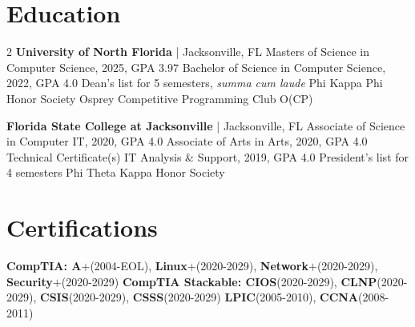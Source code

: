 \documentclass[10pt]{report}
\begin{document}
\section*{Education}
\vspace{-1.25em}
\setlength{\columnsep}{-2em}
\begin{multicols}{2}
\textbf{University of North Florida} | Jacksonville, FL \newline
Masters of Science in Computer Science, 2025, GPA 3.97 \newline
Bachelor of Science in Computer Science, 2022, GPA 4.0 \newline
Dean's list for 5 semesters, \textit{summa cum laude} \newline
Phi Kappa Phi Honor Society \newline
Osprey Competitive Programming Club O(CP)
\columnbreak

\textbf{Florida State College at Jacksonville} | Jacksonville, FL \newline
Associate of Science in Computer IT, 2020, GPA 4.0 \newline
Associate of Arts in Arts, 2020, GPA 4.0 \newline
Technical Certificate(s) IT Analysis \& Support, 2019, GPA 4.0 \newline
President's list for 4 semesters \newline
Phi Theta Kappa Honor Society
\end{multicols}
\vspace{-1em}

\section*{Certifications}
\textbf{CompTIA: A$\bm{+}$}(2004-EOL), \textbf{Linux$\bm{+}$}(2020-2029), \textbf{Network$\bm{+}$}(2020-2029), \textbf{Security$\bm{+}$}(2020-2029)\newline
\textbf{CompTIA Stackable: CIOS}(2020-2029), \textbf{CLNP}(2020-2029), \textbf{CSIS}(2020-2029), \textbf{CSSS}(2020-2029)\newline
\textbf{LPIC}(2005-2010), \textbf{CCNA}(2008-2011)
\end{document}

